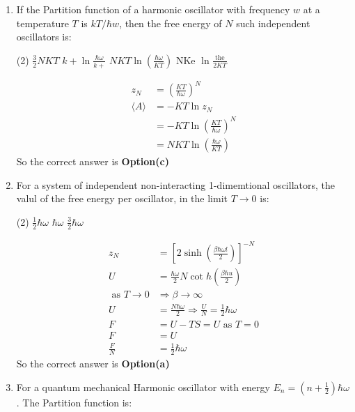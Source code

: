 \begin{enumerate}
	\item If the Partition function of a harmonic oscillator with frequency $w$ at a temperature $T$ is $k T/ \hbar w$, then the free energy of $N$ such independent oscillators is:
		\begin{tasks}(2)
			\task[\textbf{a.}]$\frac{3}{2} N K T$
			\task[\textbf{b.}]$k+\ln \frac{\hbar \omega}{k+}$
			\task[\textbf{c.}]$NKT\ln \left(\frac{\hbar \omega}{K T}\right)$
			\task[\textbf{d.}] NKe $\ln \frac{\text { the }}{2 K T}$
		\end{tasks}
	\begin{answer}
		\begin{align*}
		z_{N} &=\left(\frac{K T}{\hbar \omega}\right)^{N} \\
		\langle A\rangle &=-K T \ln z_{N} \\
		&=-K T \ln \left(\frac{K T}{\hbar \omega}\right)^{N} \\
		&=NKT\ln \left(\frac{\hbar \omega}{K T}\right)
		\end{align*}
		So the correct answer is \textbf{Option(c)}
	\end{answer}
\item For a system of independent non-interacting 1-dimemtional oscillators, the valul of the free energy per oscillator, in the limit $T \rightarrow 0$ is:
	\begin{tasks}(2)
		\task[\textbf{a.}] $\frac{1}{2} \hbar \omega$
		\task[\textbf{b.}]$\hbar\omega$
		\task[\textbf{c.}]$\frac{3}{2} \hbar \omega$
		\task[\textbf{d.}] 0
	\end{tasks}
\begin{answer}
	\begin{align*}
	z_{N}&=\left[2 \sinh \left(\frac{\beta \hbar \omega l}{2}\right)\right]^{-N}\\
	U&=\frac{\hbar \omega}{2} N \cot h\left(\frac{\beta \hbar u}{2}\right)\\
	\text { as } T \rightarrow 0 &\Rightarrow \beta \rightarrow \infty\\
	U&=\frac{N \hbar \omega}{2} \Rightarrow \frac{U}{N}=\frac{1}{2} \hbar \omega\\
	F&=U-T S=U \text { as } T=0\\
	F&=U\\
	\frac{F}{N}&=\frac{1}{2} \hbar \omega
	\end{align*}
	So the correct answer is \textbf{Option(a)}
\end{answer}	
\item For a quantum mechanical Harmonic oscillator with energy $E_{n}=\left(n+\frac{1}{2}\right) \hbar \omega$. The Partition function is:

\end{enumerate}

